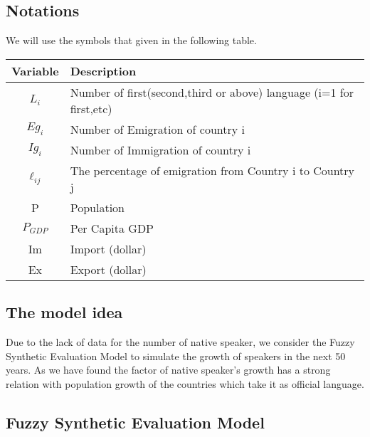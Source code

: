 \documentclass{mcmthesis}
\begin{document}
\subsection{Notations}
We will use the symbols that given in the following table.
\begin{table}[h]
\begin{center}
\begin{tabular}{c l}
\hline
\multicolumn{1}{l}{Variable} & Description                                      \\
\hline
$L_i$                            & Number of first(second,third or above) language (i=1 for first,etc)                                       \\
$ Eg_i  $                         &Number of Emigration of country i                                      \\
$ Ig_i  $                     &Number of Immigration of country i\\
$\ell_{ij}   $                       &The percentage of emigration from Country i to Country j                                         \\
P                            & Population                                \\
$P_{GDP}   $                         & Per Capita GDP                                   \\
Im                            & Import (dollar)                                       \\
Ex                            & Export (dollar)                                   \\
\hline
\end{tabular}
\end{center}
\end{table}

\subsection{The model idea}
\qquad Due to the lack of data for the number of native speaker, we consider the Fuzzy Synthetic Evaluation Model to simulate the growth of speakers in the next 50 years.
As we have found the factor of native speaker's growth has a strong relation with population growth of the countries which take it as official language.

\subsection{Fuzzy Synthetic Evaluation Model}
\end{document}
